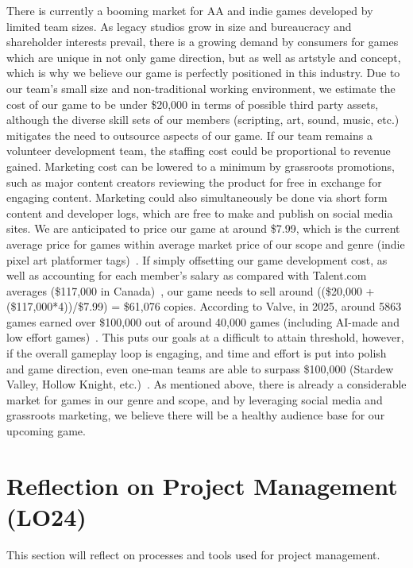 \documentclass{article}
\begin{document}
There is currently a booming market for AA and indie games developed by limited 
team sizes. As legacy studios grow in size and bureaucracy and shareholder interests 
prevail, there is a growing demand by consumers for games which are unique in not 
only game direction, but as well as artstyle and concept, which is why we believe 
our game is perfectly positioned in this industry. Due to our team's small size 
and non-traditional working environment, we estimate the cost of our game to be under 
\$20,000 in terms of possible third party assets, although the diverse skill sets 
of our members (scripting, art, sound, music, etc.) mitigates the need to outsource 
aspects of our game. If our team remains a volunteer development team, the staffing 
cost could be proportional to revenue gained. Marketing cost can be lowered to a 
minimum by grassroots promotions, such as major content creators reviewing the 
product for free in exchange for engaging content. Marketing could also 
simultaneously be done via short form content and developer logs, which are 
free to make and publish on social media sites. We are anticipated to price our 
game at around \$7.99, which is the current average price for games within 
average market price of our scope and genre (indie pixel art platformer tags)~\cite{SteamDB}. 
If simply offsetting our game development cost, as well as accounting for each 
member's salary as compared with Talent.com averages (\$117,000 in Canada)~\cite{Talent.com}, 
our game needs to sell around ((\$20,000 + (\$117,000*4))/\$7.99) = \$61,076 copies.
According to Valve, in 2025, around 5863 games earned over \$100,000 out of around 
40,000 games (including AI-made and low effort games)~\cite{Valve}. This puts our goals at a 
difficult to attain threshold, however, if the overall gameplay loop is engaging, 
and time and effort is put into polish and game direction, even one-man teams 
are able to surpass \$100,000 (Stardew Valley, Hollow Knight, etc.)~\cite{SteamDB}. As mentioned 
above, there is already a considerable market for games in our genre and scope, 
and by leveraging social media and grassroots marketing, we believe there will 
be a healthy audience base for our upcoming game.

\section{Reflection on Project Management (LO24)}

This section will reflect on processes and tools used for project management.
\end{document}
